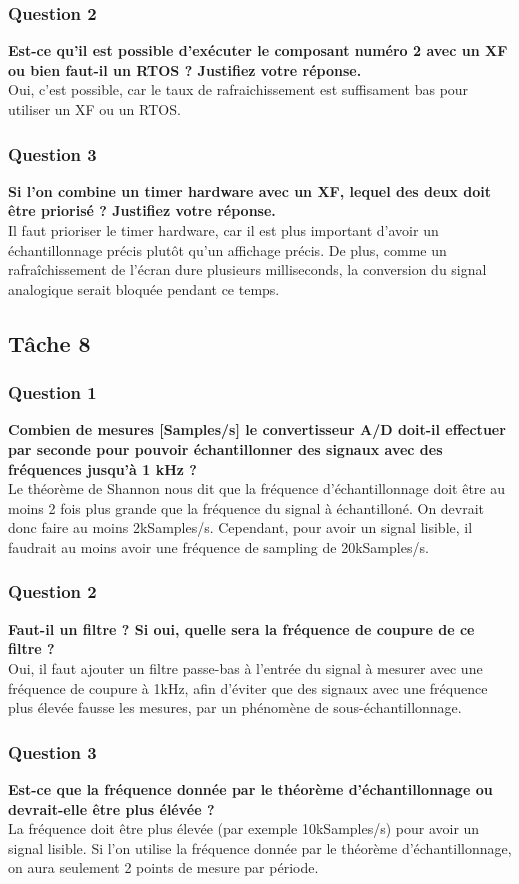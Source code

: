 \documentclass[12pt]{article}
\begin{document}
	\subsubsection{Question 2}
	\textbf{Est-ce qu'il est possible d'exécuter le composant numéro 2 avec un XF ou bien faut-il un RTOS ? Justifiez votre réponse.}\\
	Oui, c'est possible, car le taux de rafraichissement est suffisament bas pour utiliser un XF ou un RTOS.
	\subsubsection{Question 3}
	\textbf{Si l'on combine un timer hardware avec un XF, lequel des deux doit être priorisé ? Justifiez votre réponse.}\\
	Il faut prioriser le timer hardware, car il est plus important d'avoir un échantillonnage précis plutôt qu'un affichage précis. De plus, comme un rafraîchissement de l'écran dure plusieurs milliseconds, la conversion du signal analogique serait bloquée pendant ce temps.	
	\subsection{Tâche 8}
	\subsubsection{Question 1}
	\textbf{Combien de mesures [Samples/s] le convertisseur A/D doit-il effectuer par seconde pour pouvoir échantillonner des signaux avec des fréquences jusqu'à 1 kHz ?}\\
	Le théorème de Shannon nous dit que la fréquence d'échantillonnage doit être au moins 2 fois plus grande que la fréquence du signal à échantilloné. On devrait donc faire au moins 2kSamples/s. Cependant, pour avoir un signal lisible, il faudrait au moins avoir une fréquence de sampling de 20kSamples/s.
	\subsubsection{Question 2}
	\textbf{Faut-il un filtre ? Si oui, quelle sera la fréquence de coupure de ce filtre ?}\\
	Oui, il faut ajouter un filtre passe-bas à l'entrée du signal à mesurer avec une fréquence de coupure à 1kHz, afin d'éviter que des signaux avec une fréquence plus élevée fausse les mesures, par un phénomène de sous-échantillonnage.
	\subsubsection{Question 3}
	\textbf{Est-ce que la fréquence donnée par le théorème d’échantillonnage ou devrait-elle être plus élévée ?}\\
	La fréquence doit être plus élevée (par exemple 10kSamples/s) pour avoir un signal lisible. Si l'on utilise la fréquence donnée par le théorème d'échantillonnage, on aura seulement 2 points de mesure par période.
\end{document}
